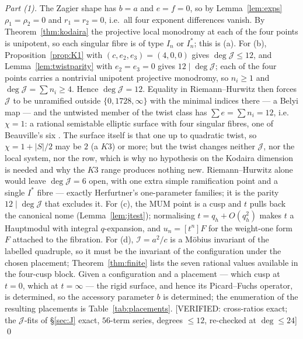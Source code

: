 \documentclass[11pt,reqno]{amsart}
\theoremstyle{plain}
\theoremstyle{definition}
\theoremstyle{remark}
\theoremstyle{plain}
\newcommand{\VerifiedR}[1]{\textup{\textsf{[VERIFIED: #1]}}}
\begin{document}
\emph{Part \textup{(1)}.} The Zagier shape has $b=a$ and $e=f=0$, so by
Lemma~\ref{lem:exps} $\rho_1=\rho_2=0$ and $r_1=r_2=0$, i.e.\ all four exponent
differences vanish. By Theorem~\ref{thm:kodaira} the projective local monodromy
at each of the four points is unipotent, so each singular fibre is of type $I_n$
or $I_n^*$; this is (a). For (b), Proposition~\ref{prop:K1} with $(c,e_2,e_3)=(4,0,0)$ gives
$\deg\mathcal J\le12$, and Lemma~\ref{lem:twistparity} with $e_2=e_3=0$ gives
$12\mid\deg\mathcal J$; each of the four points carries a nontrivial unipotent
projective monodromy, so $n_i\ge1$ and $\deg\mathcal J=\sum n_i\ge4$. Hence
$\deg\mathcal J=12$. Equality in Riemann--Hurwitz then forces $\mathcal J$ to be
unramified outside $\{0,1728,\infty\}$ with the minimal indices there --- a Belyi
map --- and the untwisted member of the twist class has $\sum e=\sum n_i=12$,
i.e.\ $\chi=1$: a rational semistable elliptic surface with four singular fibres,
one of Beauville's six \cite{Beauville1982}. The surface itself is that one up to
quadratic twist, so $\chi=1+|S|/2$ may be $2$ (a $K3$) or more; but the twist
changes neither $\mathcal J$, nor the local system, nor the row, which is why no
hypothesis on the Kodaira dimension is needed and why the $K3$ range produces
nothing new. Riemann--Hurwitz alone would leave $\deg\mathcal J=6$ open, with one
extra simple ramification point and a single $I^*$ fibre --- exactly Herfurtner's
one-parameter families; it is the parity $12\mid\deg\mathcal J$ that excludes it.
For (c), the MUM point is a cusp and $t$ pulls back the canonical nome
(Lemma~\ref{lem:jtest}); normalising $t=q_h+O(q_h^2)$ makes $t$ a Hauptmodul with
integral $q$-expansion, and $u_n=[t^n]F$ for the weight-one form $F$ attached to
the fibration. For (d), $\mathcal I=a^2/c$ is a M\"obius invariant of the
labelled quadruple, so it must be the invariant of the configuration under the
chosen placement; Theorem~\ref{thm:finite} lists the seven rational values
available in the four-cusp block. Given a configuration and a placement --- which
cusp at $t=0$, which at $t=\infty$ --- the rigid surface, and hence its
Picard--Fuchs operator, is determined, so the accessory parameter $b$ is
determined; the enumeration of the resulting placements is
Table~\ref{tab:placements}.
\VerifiedR{cross-ratios exact; the $\mathcal J$-fits of \S\ref{sec:J} exact,
$56$-term series, degrees $\le12$, re-checked at $\deg\le24$} \qed
\end{document}
